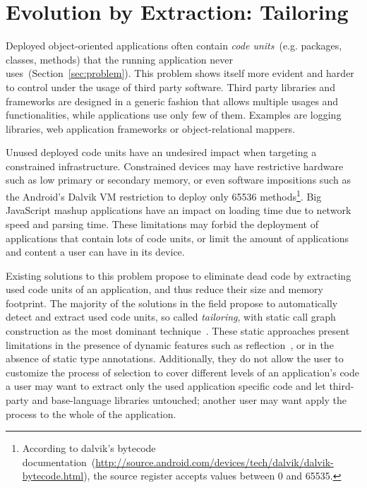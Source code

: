 
\chapter{Evolution by Extraction: Tailoring}
\minitoc
\introduction

Deployed object-oriented applications often contain \emph{code units}~(e.g. packages, classes, methods) that the running application never uses~(Section~\ref{sec:problem}).
This problem shows itself more evident and harder to control under the usage of third party software. 
Third party libraries and frameworks are designed in a generic fashion that allows multiple usages and functionalities, while applications use only few of them. 
Examples are logging libraries, web application frameworks or object-relational mappers.

Unused deployed code units have an undesired impact when targeting a constrained infrastructure. 
Constrained devices may have restrictive hardware such as low primary or secondary memory, or even software impositions such as the Android's Dalvik VM restriction to deploy only 65536 methods\footnote{According to dalvik's bytecode documentation~(\url{http://source.android.com/devices/tech/dalvik/dalvik-bytecode.html}), the source register accepts values between 0 and 65535.}. Big JavaScript mashup applications have an impact on loading time due to network speed and parsing time.
These limitations may forbid the deployment of applications that contain lots of code units, or limit the amount of applications and content a user can have in its device.

Existing solutions to this problem propose to eliminate dead code by extracting used code units of an application, and thus reduce their size and memory footprint. The majority of the solutions in the field propose to automatically detect and extract used code units, so called \emph{tailoring}, with static call graph construction as the most dominant technique~\cite{Grov97a}. 
These static approaches present limitations in the presence of dynamic features such as reflection~\cite{Livs05a}, or in the absence of static type annotations. Additionally, they do not allow the user to customize the process of selection to cover different levels of an application's code \ie a user may want to extract only the used application specific code and let third-party and base-language libraries untouched; another user may want apply the process to the whole of the application.

